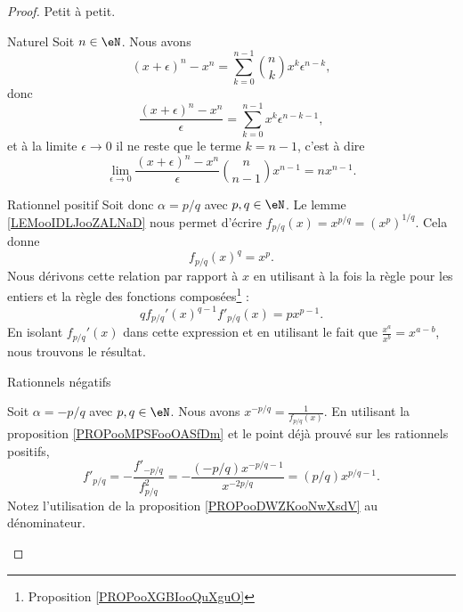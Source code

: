 \begin{proof}
    Petit à petit.
    \begin{subproof}
        \item[Naturel]
            Soit \( n\in \eN\). Nous avons
            \begin{equation}
                (x+\epsilon)^n-x^n=\sum_{k=0}^{n-1}{n\choose k}x^k\epsilon^{n-k},
            \end{equation}
            donc
            \begin{equation}
                \frac{ (x+\epsilon)^n-x^n }{ \epsilon }=\sum_{k=0}^{n-1}x^k\epsilon^{n-k-1},
            \end{equation}
            et à la limite \( \epsilon\to 0\) il ne reste que le terme \( k=n-1\), c'est à dire
            \begin{equation}
                \lim_{\epsilon\to 0}\frac{ (x+\epsilon)^n-x^n }{ \epsilon }{n\choose n-1}x^{n-1}=nx^{n-1}.
            \end{equation}
        \item[Rationnel positif]
            Soit donc \( \alpha=p/q\) avec \( p,q\in \eN\). Le lemme \ref{LEMooIDLJooZALNaD} nous permet d'écrire \( f_{p/q}(x)=x^{p/q}=(x^p)^{1/q}\). Cela donne
            \begin{equation}
                f_{p/q}(x)^q=x^p.
            \end{equation}
            Nous dérivons cette relation par rapport à \( x\) en utilisant à la fois la règle pour les entiers et la règle des fonctions composées\footnote{Proposition \ref{PROPooXGBIooQuXguO}} :
            \begin{equation}
                qf_{p/q}'(x)^{q-1}f'_{p/q}(x)=px^{p-1}.
            \end{equation}
            En isolant \( f_{p/q}'(x)\) dans cette expression et en utilisant le fait que \( \frac{ x^a }{ x^b }=x^{a-b}\), nous trouvons le résultat.

        \item[Rationnels négatifs]

            Soit \( \alpha=-p/q\) avec \( p,q\in \eN\). Nous avons \( x^{-p/q}=\frac{1}{ f_{p/q}(x) }\). En utilisant la proposition \ref{PROPooMPSFooOASfDm} et le point déjà prouvé sur les rationnels positifs,
            \begin{equation}
                f'_{p/q}=-\frac{ f'_{-p/q} }{ f_{p/q}^2 }=-\frac{ (-p/q)x^{-p/q-1} }{ x^{-2p/q} }=(p/q)x^{p/q-1}.
            \end{equation}
            Notez l'utilisation de la proposition \ref{PROPooDWZKooNwXsdV} au dénominateur.


\end{subproof}
\end{proof}
